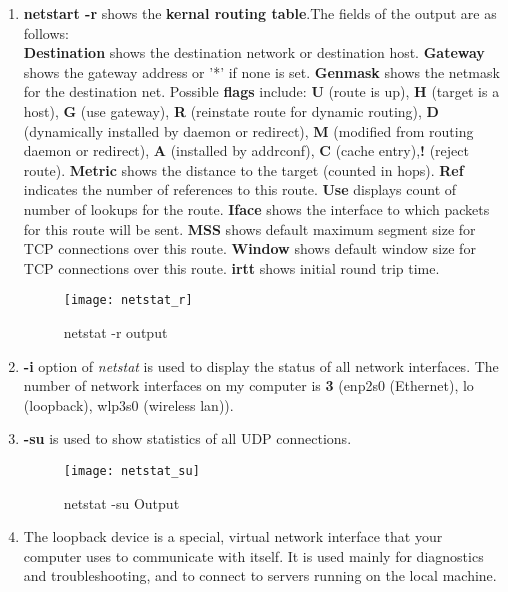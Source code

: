\documentclass[12pt]{report}
\begin{document}
\begin{enumerate}[label=\textbf{(\alph*)}]
		\item \textbf{netstart -r} shows the \textbf{kernal routing table}.The fields of the output are as follows:\\[1pt] \textbf{Destination} shows the destination network or destination host. \textbf{Gateway} shows the gateway address or '*' if none is set. \textbf{Genmask} shows the netmask for the destination net. Possible \textbf{flags} include: \textbf{U} (route is up), \textbf{H} (target is a host), \textbf{G} (use gateway), \textbf{R} (reinstate route for dynamic routing), \textbf{D} (dynamically installed by daemon or redirect), \textbf{M} (modified from routing daemon or redirect), \textbf{A} (installed by addrconf), \textbf{C} (cache entry),\textbf{!} (reject route). \textbf{Metric} shows the distance to the target (counted in hops). \textbf{Ref} indicates the number of references to this route. \textbf{Use} displays count of number of lookups for the route. \textbf{Iface} shows the interface to which packets for this route will be sent. \textbf{MSS} shows default maximum segment size for TCP connections over this route. \textbf{Window} shows default window size for TCP connections over this route. \textbf{irtt} shows initial round trip time.
		\begin{figure}[H]
			\centering
			\texttt{[image: netstat\_r]}
			\caption{netstat -r output}
		\end{figure}
		\pagebreak
		\vspace*{10px}
		\item \textbf{-i} option of \textit{netstat} is used to display the status of all network interfaces. The number of network interfaces on my computer is \textbf{3} (enp2s0 (Ethernet), lo (loopback), wlp3s0 (wireless lan)).
		
		\item \textbf{-su} is used to show statistics of all UDP connections.
		\begin{figure}[H]
			\centering
			\texttt{[image: netstat\_su]}
			\caption{netstat -su Output}
		\end{figure}
		
		\item The loopback device is a special, virtual network interface that your computer uses to communicate with itself. It is used mainly for diagnostics and troubleshooting, and to connect to servers running on the local machine.
	\end{enumerate}
	
\end{document}
